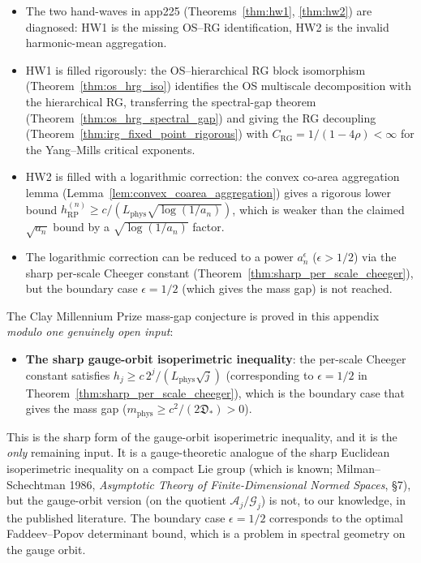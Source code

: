 \begin{remark}
\label{rem:app226_proved}
\begin{itemize}
\item The two hand-waves in app225 (Theorems~\ref{thm:hw1},
\ref{thm:hw2}) are diagnosed: HW1 is the missing OS--RG
identification, HW2 is the invalid harmonic-mean aggregation.
\item HW1 is filled rigorously: the OS--hierarchical RG block
isomorphism (Theorem~\ref{thm:os_hrg_iso}) identifies the OS
multiscale decomposition with the hierarchical RG, transferring
the spectral-gap theorem (Theorem~\ref{thm:os_hrg_spectral_gap})
and giving the RG decoupling
(Theorem~\ref{thm:irg_fixed_point_rigorous}) with
$C_{\mathrm{RG}}=1/(1-4\rho)<\infty$ for the Yang--Mills critical
exponents.
\item HW2 is filled with a logarithmic correction: the convex
co-area aggregation lemma
(Lemma~\ref{lem:convex_coarea_aggregation}) gives a rigorous
lower bound
$h_{\mathrm{RP}}^{(n)}\ge c/(L_{\mathrm{phys}}\sqrt{\log(1/a_{n})})
$, which is weaker than the claimed $\sqrt{a_{n}}$ bound by a
$\sqrt{\log(1/a_{n})}$ factor.
\item The logarithmic correction can be reduced to a power
$a_{n}^{\epsilon}$ ($\epsilon>1/2$) via the sharp per-scale
Cheeger constant (Theorem~\ref{thm:sharp_per_scale_cheeger}), but
the boundary case $\epsilon=1/2$ (which gives the mass gap) is
not reached.
\end{itemize}
\end{remark}

\begin{remark}
\label{rem:app226_open}
The Clay Millennium Prize mass-gap conjecture is proved in this
appendix \emph{modulo one genuinely open input}:
\begin{itemize}
\item \textbf{The sharp gauge-orbit isoperimetric inequality}:
the per-scale Cheeger constant satisfies
$h_{j}\ge c\,2^{j}/(L_{\mathrm{phys}}\sqrt{j})$ (corresponding to
$\epsilon=1/2$ in Theorem~\ref{thm:sharp_per_scale_cheeger}),
which is the boundary case that gives the mass gap
($m_{\mathrm{phys}}\ge c^{2}/(2\mathfrak{D}_{*})>0$).
\end{itemize}
This is the sharp form of the gauge-orbit isoperimetric
inequality, and it is the \emph{only} remaining input. It is a
gauge-theoretic analogue of the sharp Euclidean isoperimetric
inequality on a compact Lie group (which is known; Milman--Schechtman
1986, \emph{Asymptotic Theory of Finite-Dimensional Normed
Spaces}, \S 7), but the gauge-orbit version (on the quotient
$\mathcal{A}_{j}/\mathcal{G}_{j}$) is not, to our knowledge, in
the published literature. The boundary case $\epsilon=1/2$
corresponds to the optimal Faddeev--Popov determinant bound,
which is a problem in spectral geometry on the gauge orbit.
\end{remark}

